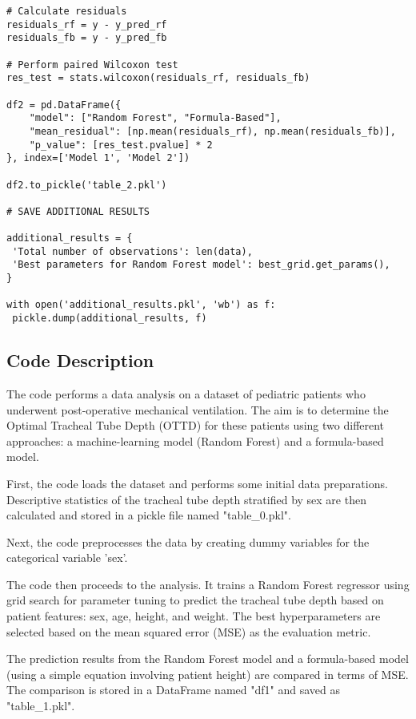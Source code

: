 \documentclass[11pt]{article}
\begin{document}
\begin{verbatim}
# Calculate residuals
residuals_rf = y - y_pred_rf
residuals_fb = y - y_pred_fb

# Perform paired Wilcoxon test
res_test = stats.wilcoxon(residuals_rf, residuals_fb)

df2 = pd.DataFrame({
    "model": ["Random Forest", "Formula-Based"],
    "mean_residual": [np.mean(residuals_rf), np.mean(residuals_fb)],
    "p_value": [res_test.pvalue] * 2
}, index=['Model 1', 'Model 2'])

df2.to_pickle('table_2.pkl')

# SAVE ADDITIONAL RESULTS

additional_results = {
 'Total number of observations': len(data), 
 'Best parameters for Random Forest model': best_grid.get_params(),
}

with open('additional_results.pkl', 'wb') as f:
 pickle.dump(additional_results, f)

\end{verbatim}

\subsection{Code Description}

The code performs a data analysis on a dataset of pediatric patients who underwent post-operative mechanical ventilation. The aim is to determine the Optimal Tracheal Tube Depth (OTTD) for these patients using two different approaches: a machine-learning model (Random Forest) and a formula-based model.

First, the code loads the dataset and performs some initial data preparations. Descriptive statistics of the tracheal tube depth stratified by sex are then calculated and stored in a pickle file named "table\_0.pkl".

Next, the code preprocesses the data by creating dummy variables for the categorical variable 'sex'.

The code then proceeds to the analysis. It trains a Random Forest regressor using grid search for parameter tuning to predict the tracheal tube depth based on patient features: sex, age, height, and weight. The best hyperparameters are selected based on the mean squared error (MSE) as the evaluation metric.

The prediction results from the Random Forest model and a formula-based model (using a simple equation involving patient height) are compared in terms of MSE. The comparison is stored in a DataFrame named "df1" and saved as "table\_1.pkl".
\end{document}
